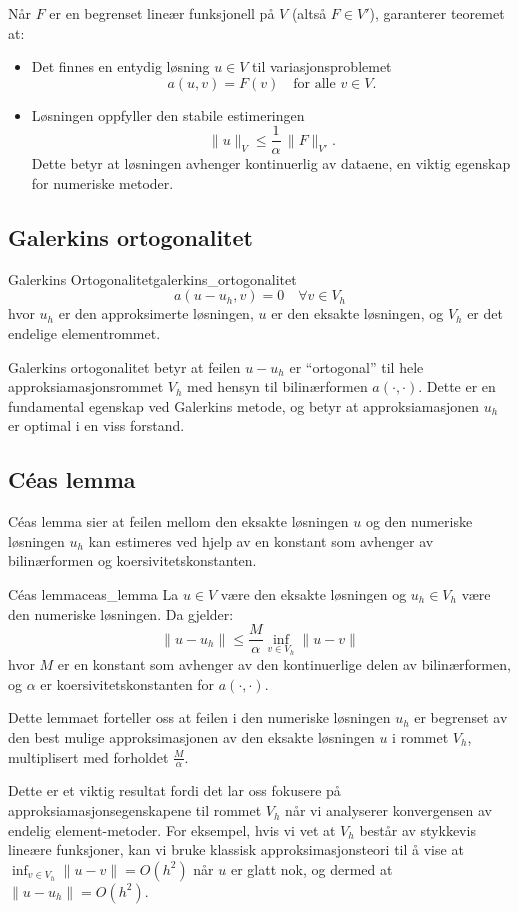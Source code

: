 \documentclass[../../main.tex]{subfiles}
\begin{document}
Når $F$ er en begrenset lineær funksjonell på $V$ (altså $F \in V'$), garanterer teoremet at:
\begin{itemize}
    \item Det finnes en entydig løsning $u \in V$ til variasjonsproblemet
          \[
              a(u,v)=F(v) \quad \text{for alle } v\in V.
          \]

    \item Løsningen oppfyller den stabile estimeringen
          \[
              \|u\|_V \leq \frac{1}{\alpha}\, \|F\|_{V'}.
          \]
          Dette betyr at løsningen avhenger kontinuerlig av dataene, en viktig egenskap for numeriske metoder.
\end{itemize}

\subsection{Galerkins ortogonalitet}
\begin{definition}{Galerkins Ortogonalitet}{galerkins_ortogonalitet}
    \[
        a(u - u_h, v) = 0 \quad \forall v \in V_h
    \]
    hvor $u_h$ er den approksimerte løsningen, $u$ er den eksakte løsningen, og $V_h$ er det endelige elementrommet.
\end{definition}

Galerkins ortogonalitet betyr at feilen $u - u_h$ er \enquote{ortogonal} til hele approksiamasjonsrommet $V_h$ med hensyn til bilinærformen $a(\cdot,\cdot)$. Dette er en fundamental egenskap ved Galerkins metode, og betyr at approksiamasjonen $u_h$ er optimal i en viss forstand.

\subsection{Céas lemma}
Céas lemma sier at feilen mellom den eksakte løsningen $u$ og den numeriske løsningen $u_h$ kan estimeres ved hjelp av en konstant som avhenger av bilinærformen og koersivitetskonstanten.

\begin{lemma}{Céas lemma}{ceas_lemma}
    La $u \in V$ være den eksakte løsningen og $u_h \in V_h$ være den numeriske løsningen. Da gjelder:
    \[
        \| u - u_h \| \leq \frac{M}{\alpha} \inf_{v \in V_h} \| u - v \|
    \]
    hvor $M$ er en konstant som avhenger av den kontinuerlige delen av bilinærformen, og $\alpha$ er koersivitetskonstanten for $a(\cdot,\cdot)$.
\end{lemma}

Dette lemmaet forteller oss at feilen i den numeriske løsningen $u_h$ er begrenset av den best mulige approksimasjonen av den eksakte løsningen $u$ i rommet $V_h$, multiplisert med forholdet $\frac{M}{\alpha}$.

Dette er et viktig resultat fordi det lar oss fokusere på approksiamasjonsegenskapene til rommet $V_h$ når vi analyserer konvergensen av endelig element-metoder. For eksempel, hvis vi vet at $V_h$ består av stykkevis lineære funksjoner, kan vi bruke klassisk approksimasjonsteori til å vise at $\inf_{v \in V_h} \| u - v \| = O(h^2)$ når $u$ er glatt nok, og dermed at $\| u - u_h \| = O(h^2)$.
\end{document}

